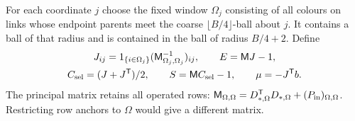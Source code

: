 \documentclass[11pt,reqno]{amsart}
\numberwithin{equation}{section}
\theoremstyle{definition}
\theoremstyle{remark}
\begin{document}
For each coordinate \(j\) choose the fixed window \(\Omega_j\)
consisting of all colours on links whose endpoint parents meet
the coarse \(\lfloor B/4\rfloor\)-ball about \(j\).
It contains a ball of that radius and is contained in the ball
of radius \(B/4+2\). Define
\begin{equation}
 \begin{gathered}
 J_{ij}=1_{\{i\in\Omega_j\}}(\mathsf M_{\Omega_j,\Omega_j}^{-1})_{ij},
 \qquad E=\mathsf MJ-1,\\
 C_{\rm sel}=(J+J^{\mathsf T})/2,\qquad
 S=\mathsf MC_{\rm sel}-1,\qquad \mu=-J^{\mathsf T}b.
 \end{gathered}
 \label{eq:physical-selected-windows}
\end{equation}
The principal matrix retains all operated rows:
\(\mathsf M_{\Omega,\Omega}=D_{*,\Omega}^{\mathsf T}D_{*,\Omega}
+(P_{\rm in})_{\Omega,\Omega}\). Restricting row anchors to
\(\Omega\) would give a different matrix.
\end{document}
